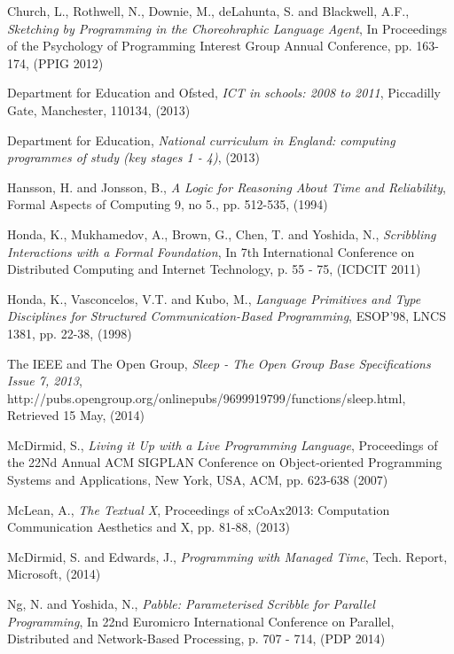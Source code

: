 \documentclass[11pt]{scrartcl}
\begin{document}
\begin{thebibliography}{9}
  Church, L., Rothwell, N., Downie, M., deLahunta, S. and Blackwell, A.F.,
  \emph{Sketching by Programming in the Choreohraphic Language Agent},
  In Proceedings of the Psychology of Programming Interest Group Annual Conference,
  pp. 163-174,
  (PPIG 2012)

  Department for Education and Ofsted,
  \emph{ICT in schools: 2008 to 2011},
  Piccadilly Gate,
  Manchester,
  110134,
  (2013)

  Department for Education,
  \emph{National curriculum in England: computing programmes of study (key stages 1 - 4)},
  (2013)

  Hansson, H. and Jonsson, B.,
  \emph{A Logic for Reasoning About Time and Reliability},
  Formal Aspects of Computing 9,
  no 5., pp. 512-535,
  (1994)

  Honda, K., Mukhamedov, A., Brown, G., Chen, T. and Yoshida, N.,
  \emph{Scribbling Interactions with a Formal Foundation},
  In 7th International Conference on Distributed Computing and Internet Technology,
  p. 55 - 75,
  (ICDCIT 2011)

  Honda, K., Vasconcelos, V.T. and Kubo, M.,
  \emph{Language Primitives and Type Disciplines for Structured Communication-Based Programming},
  ESOP'98, LNCS 1381,
  pp. 22-38,
  (1998)

  The IEEE and The Open Group,
  \emph{Sleep - The Open Group Base Specifications Issue 7, 2013},
  http://pubs.opengroup.org/onlinepubs/9699919799/functions/sleep.html,
  Retrieved 15 May,
  (2014)

  McDirmid, S.,
  \emph{Living it Up with a Live Programming Language},
  Proceedings of the 22Nd Annual ACM SIGPLAN Conference on Object-oriented Programming Systems and Applications,
  New York, USA,
  ACM, pp. 623-638
  (2007)

  McLean, A.,
  \emph{The Textual X},
  Proceedings of xCoAx2013: Computation Communication Aesthetics and X,
  pp. 81-88,
  (2013)

  McDirmid, S. and Edwards, J.,
  \emph{Programming with Managed Time},
  Tech. Report, Microsoft,
  (2014)

  Ng, N. and Yoshida, N.,
  \emph{Pabble: Parameterised Scribble for Parallel Programming},
  In 22nd Euromicro International Conference on Parallel, Distributed and Network-Based Processing, 
  p. 707 - 714,
  (PDP 2014)


\end{thebibliography}
\end{document}

